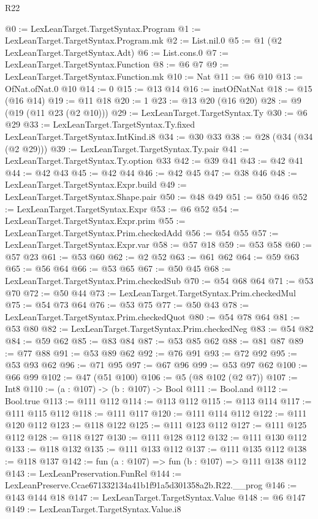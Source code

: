 \begin{lexlean}{R22}
\begin{coremodule}
@0 := LexLeanTarget.TargetSyntax.Program
@1 := LexLeanTarget.TargetSyntax.Program.mk
@2 := List.nil.{0}
@5 := @1 (@2 LexLeanTarget.TargetSyntax.Adt)
@6 := List.cons.{0}
@7 := LexLeanTarget.TargetSyntax.Function
@8 := @6 @7
@9 := LexLeanTarget.TargetSyntax.Function.mk
@10 := Nat
@11 := @6 @10
@13 := OfNat.ofNat.{0} @10
@14 := 0
@15 := @13 @14
@16 := instOfNatNat
@18 := @15 (@16 @14)
@19 := @11 @18
@20 := 1
@23 := @13 @20 (@16 @20)
@28 := @9 (@19 (@11 @23 (@2 @10)))
@29 := LexLeanTarget.TargetSyntax.Ty
@30 := @6 @29
@33 := LexLeanTarget.TargetSyntax.Ty.fixed LexLeanTarget.TargetSyntax.IntKind.i8
@34 := @30 @33
@38 := @28 (@34 (@34 (@2 @29)))
@39 := LexLeanTarget.TargetSyntax.Ty.pair
@41 := LexLeanTarget.TargetSyntax.Ty.option @33
@42 := @39 @41
@43 := @42 @41
@44 := @42 @43
@45 := @42 @44
@46 := @42 @45
@47 := @38 @46
@48 := LexLeanTarget.TargetSyntax.Expr.build
@49 := LexLeanTarget.TargetSyntax.Shape.pair
@50 := @48 @49
@51 := @50 @46
@52 := LexLeanTarget.TargetSyntax.Expr
@53 := @6 @52
@54 := LexLeanTarget.TargetSyntax.Expr.prim
@55 := LexLeanTarget.TargetSyntax.Prim.checkedAdd
@56 := @54 @55
@57 := LexLeanTarget.TargetSyntax.Expr.var
@58 := @57 @18
@59 := @53 @58
@60 := @57 @23
@61 := @53 @60
@62 := @2 @52
@63 := @61 @62
@64 := @59 @63
@65 := @56 @64
@66 := @53 @65
@67 := @50 @45
@68 := LexLeanTarget.TargetSyntax.Prim.checkedSub
@70 := @54 @68 @64
@71 := @53 @70
@72 := @50 @44
@73 := LexLeanTarget.TargetSyntax.Prim.checkedMul
@75 := @54 @73 @64
@76 := @53 @75
@77 := @50 @43
@78 := LexLeanTarget.TargetSyntax.Prim.checkedQuot
@80 := @54 @78 @64
@81 := @53 @80
@82 := LexLeanTarget.TargetSyntax.Prim.checkedNeg
@83 := @54 @82
@84 := @59 @62
@85 := @83 @84
@87 := @53 @85 @62
@88 := @81 @87
@89 := @77 @88
@91 := @53 @89 @62
@92 := @76 @91
@93 := @72 @92
@95 := @53 @93 @62
@96 := @71 @95
@97 := @67 @96
@99 := @53 @97 @62
@100 := @66 @99
@102 := @47 (@51 @100)
@106 := @5 (@8 @102 (@2 @7))
@107 := Int8
@110 := (a : @107) -> (b : @107) -> Bool
@111 := Bool.and
@112 := Bool.true
@113 := @111 @112
@114 := @113 @112
@115 := @113 @114
@117 := @111 @115 @112
@118 := @111 @117
@120 := @111 @114 @112
@122 := @111 @120 @112
@123 := @118 @122
@125 := @111 @123 @112
@127 := @111 @125 @112
@128 := @118 @127
@130 := @111 @128 @112
@132 := @111 @130 @112
@133 := @118 @132
@135 := @111 @133 @112
@137 := @111 @135 @112
@138 := @118 @137
@142 := fun (a : @107) => fun (b : @107) => @111 @138 @112
@143 := LexLeanPreservation.FunRel
@144 := LexLeanPreserve.Ccae671332134a41b1f91a5d301358a2b.R22.__prog
@146 := @143 @144 @18
@147 := LexLeanTarget.TargetSyntax.Value
@148 := @6 @147
@149 := LexLeanTarget.TargetSyntax.Value.i8

\end{coremodule}
\end{lexlean}
